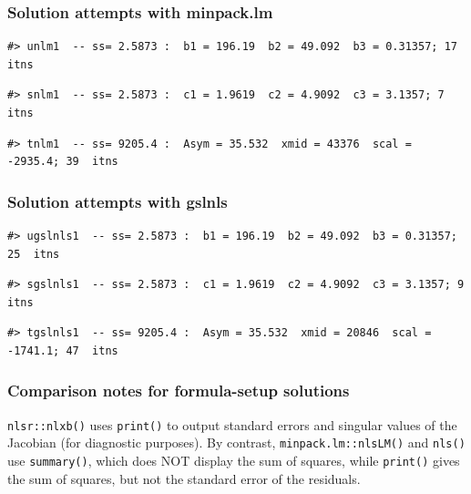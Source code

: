 \subsubsection{Solution attempts with minpack.lm}\label{solution-attempts-with-minpack.lm}

\begin{verbatim}
#> unlm1  -- ss= 2.5873 :  b1 = 196.19  b2 = 49.092  b3 = 0.31357; 17  itns
\end{verbatim}

\begin{verbatim}
#> snlm1  -- ss= 2.5873 :  c1 = 1.9619  c2 = 4.9092  c3 = 3.1357; 7  itns
\end{verbatim}

\begin{verbatim}
#> tnlm1  -- ss= 9205.4 :  Asym = 35.532  xmid = 43376  scal = -2935.4; 39  itns
\end{verbatim}

\subsubsection{Solution attempts with gslnls}\label{solution-attempts-with-gslnls}

\begin{verbatim}
#> ugslnls1  -- ss= 2.5873 :  b1 = 196.19  b2 = 49.092  b3 = 0.31357; 25  itns
\end{verbatim}

\begin{verbatim}
#> sgslnls1  -- ss= 2.5873 :  c1 = 1.9619  c2 = 4.9092  c3 = 3.1357; 9  itns
\end{verbatim}

\begin{verbatim}
#> tgslnls1  -- ss= 9205.4 :  Asym = 35.532  xmid = 20846  scal = -1741.1; 47  itns
\end{verbatim}

\subsubsection{Comparison notes for formula-setup solutions}\label{comparison-notes-for-formula-setup-solutions}

\texttt{nlsr::nlxb()} uses \texttt{print()} to output standard errors and
singular values of the Jacobian (for diagnostic purposes). By contrast,
\texttt{minpack.lm::nlsLM()} and \texttt{nls()}
use \texttt{summary()}, which does NOT display the sum of squares, while \texttt{print()}
gives the sum of squares, but not the standard error of the residuals.

